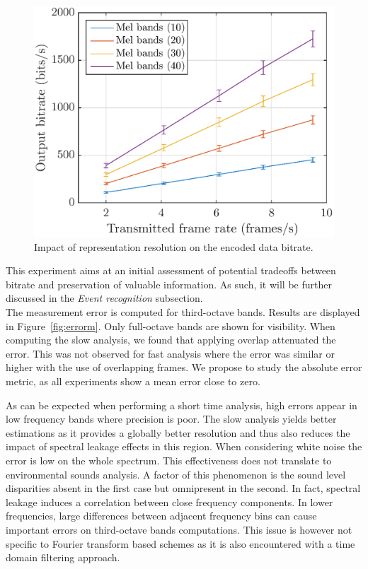 \documentclass[final,3p,times,twocolumn]{elsarticle}
\begin{document}
\begin{figure}[htbp]
	\centering
		\includegraphics[width=\columnwidth]{figures/bitrate_mel_avg.eps}
	\caption{Impact of representation resolution on the encoded data bitrate.}
	\label{fig:bitrate_mel_avg}
\end{figure}

This experiment aims at an initial assessment of potential tradeoffs between bitrate and preservation of valuable information. As such, it will be further discussed in the \textit{Event recognition} subsection.\\

The measurement error is computed for third-octave bands. Results are displayed in Figure~\ref{fig:errorm}. Only full-octave bands are shown for visibility. When computing the slow analysis, we found that applying overlap attenuated the error. This was not observed for fast analysis where the error was similar or higher with the use of overlapping frames. We propose to study the absolute error metric, as all experiments show a mean error close to zero.

As can be expected when performing a short time analysis, high errors appear in low frequency bands where precision is poor. The slow analysis yields better estimations as it provides a globally better resolution and thus also reduces the impact of spectral leakage effects in this region. When considering white noise the error is low on the whole spectrum. This effectiveness does not translate to environmental sounds analysis. A factor of this phenomenon is the sound level disparities absent in the first case but omnipresent in the second. In fact, spectral leakage induces a correlation between close frequency components. In lower frequencies, large differences between adjacent frequency bins can cause important errors on third-octave bands computations. This issue is however not specific to Fourier transform based schemes as it is also encountered with a time domain filtering approach.
\end{document}
